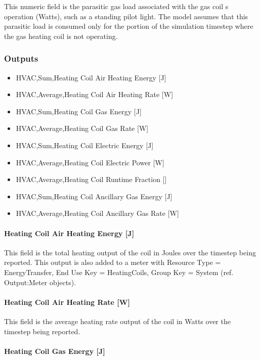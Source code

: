 This numeric field is the parasitic gas load associated with the gas coil s operation (Watts), such as a standing pilot light. The model assumes that this parasitic load is consumed only for the portion of the simulation timestep where the gas heating coil is not operating.

\subsubsection{Outputs}\label{outputs-9-002}

\begin{itemize}
\item
  HVAC,Sum,Heating Coil Air Heating Energy {[}J{]}
\item
  HVAC,Average,Heating Coil Air Heating Rate {[}W{]}
\item
  HVAC,Sum,Heating Coil Gas Energy {[}J{]}
\item
  HVAC,Average,Heating Coil Gas Rate {[}W{]}
\item
  HVAC,Sum,Heating Coil Electric Energy {[}J{]}
\item
  HVAC,Average,Heating Coil Electric Power {[}W{]}
\item
  HVAC,Average,Heating Coil Runtime Fraction {[]}
\item
  HVAC,Sum,Heating Coil Ancillary Gas Energy {[}J{]}
\item
  HVAC,Average,Heating Coil Ancillary Gas Rate {[}W{]}
\end{itemize}

\paragraph{Heating Coil Air Heating Energy {[}J{]}}\label{heating-coil-air-heating-energy-j-2}

This field is the total heating output of the coil in Joules over the timestep being reported. This output is also added to a meter with Resource Type = EnergyTransfer, End Use Key = HeatingCoils, Group Key = System (ref. Output:Meter objects).

\paragraph{Heating Coil Air Heating Rate {[}W{]}}\label{heating-coil-air-heating-rate-w-2}

This field is the average heating rate output of the coil in Watts over the timestep being reported.

\paragraph{Heating Coil Gas Energy {[}J{]}}\label{heating-coil-gas-energy-j}

